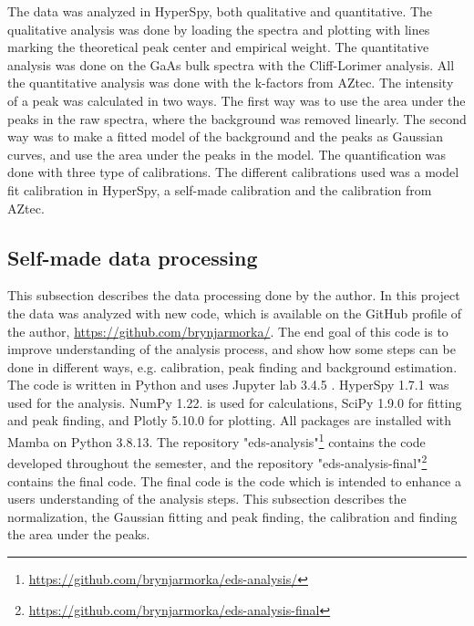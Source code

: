 

The data was analyzed in HyperSpy, both qualitative and quantitative.
The qualitative analysis was done by loading the spectra and plotting with lines marking the theoretical peak center and empirical weight.
The quantitative analysis was done on the GaAs bulk spectra with the Cliff-Lorimer analysis.
All the quantitative analysis was done with the k-factors from AZtec.
The intensity of a peak was calculated in two ways.
The first way was to use the area under the peaks in the raw spectra, where the background was removed linearly.
The second way was to make a fitted model of the background and the peaks as Gaussian curves, and use the area under the peaks in the model.
The quantification was done with three type of calibrations.
The different calibrations used was a model fit calibration in HyperSpy, a self-made calibration and the calibration from AZtec.


%
%

\subsection{Self-made data processing}
\label{sec:method:data_processing:self_made}

This subsection describes the data processing done by the author.
In this project the data was analyzed with new code, which is available on the GitHub profile of the author, \url{https://github.com/brynjarmorka/}.
The end goal of this code is to improve understanding of the analysis process, and show how some steps can be done in different ways, e.g. calibration, peak finding and background estimation.
The code is written in Python \cite{python} and uses Jupyter lab 3.4.5 \cite{jupyter}.
HyperSpy 1.7.1 \cite{hyperspy_1.7.1} was used for the analysis.
NumPy 1.22. \cite{numpy} is used for calculations, SciPy 1.9.0 \cite{2020SciPy} for fitting and peak finding, and Plotly 5.10.0 \cite{plotly} for plotting.
All packages are installed with Mamba on Python 3.8.13.
The repository "eds-analysis"\footnote{\url{https://github.com/brynjarmorka/eds-analysis/}} contains the code developed throughout the semester, and the repository "eds-analysis-final"\footnote{\url{https://github.com/brynjarmorka/eds-analysis-final}} contains the final code.
The final code is the code which is intended to enhance a users understanding of the analysis steps.
This subsection describes the normalization, the Gaussian fitting and peak finding, the calibration and finding the area under the peaks.



